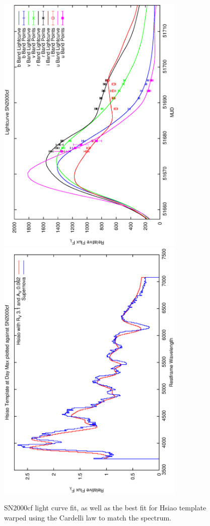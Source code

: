 \clearpage

\begin{figure}[p]
\centering
\includegraphics[angle=-90,width=0.8\textwidth]{./figures/ltcv/SN2000cf_v027_lightcurve.ps}
\hfill
\includegraphics[angle=-90,width=0.8\textwidth]{./figures/hsiao/SN2000cf_v001_hsiao.ps}
\hfill
\caption{SN2000cf light curve fit, as well as the best fit for Hsiao template warped using the Cardelli law to match the spectrum.}
\label{fig:SN2000cffour2}
\end{figure}

